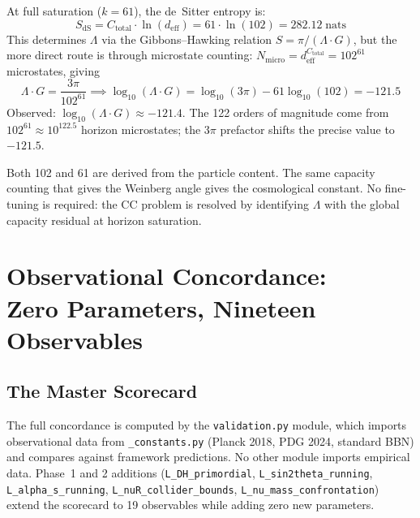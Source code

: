 \documentclass[11pt]{article}
\newcommand{\nats}{\;\mathrm{nats}}
\begin{document}
At full saturation ($k=61$), the de~Sitter entropy is:
\begin{equation}
S_{\mathrm{dS}} = C_{\mathrm{total}} \cdot \ln(d_{\mathrm{eff}}) = 61 \cdot \ln(102) = 282.12\nats
\end{equation}
This determines $\Lambda$ via the Gibbons--Hawking relation $S = \pi/(\Lambda\cdot G)$, but the more direct route is through microstate counting: $N_{\mathrm{micro}} = d_{\mathrm{eff}}^{C_{\mathrm{total}}} = 102^{61}$ microstates, giving
\begin{equation}
\Lambda \cdot G = \frac{3\pi}{102^{61}} \implies \log_{10}(\Lambda \cdot G) = \log_{10}(3\pi) - 61\log_{10}(102) = -121.5
\end{equation}
Observed: $\log_{10}(\Lambda\cdot G) \approx -121.4$.  The 122 orders of magnitude come from $102^{61} \approx 10^{122.5}$ horizon microstates; the $3\pi$ prefactor shifts the precise value to $-121.5$.

Both 102 and 61 are derived from the particle content.  The same capacity counting that gives the Weinberg angle gives the cosmological constant.  No fine-tuning is required: the CC problem is resolved by identifying $\Lambda$ with the global capacity residual at horizon saturation.


\section{Observational Concordance:\\ Zero Parameters, Nineteen Observables}

\subsection{The Master Scorecard}

The full concordance is computed by the \texttt{validation.py} module, which imports observational data from \texttt{\_constants.py} (Planck 2018, PDG 2024, standard BBN) and compares against framework predictions.  No other module imports empirical data.  Phase~1 and 2 additions (\texttt{L\_DH\_primordial}, \texttt{L\_sin2theta\_running}, \texttt{L\_alpha\_s\_running}, \texttt{L\_nuR\_collider\_bounds}, \texttt{L\_nu\_mass\_confrontation}) extend the scorecard to 19 observables while adding zero new parameters.
\end{document}
